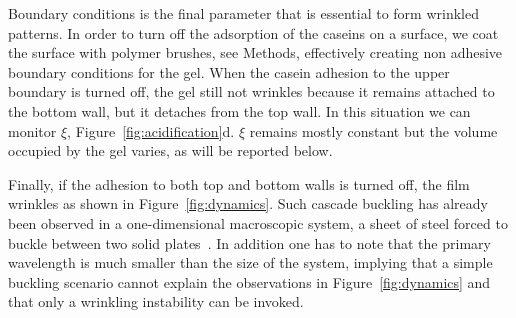 \documentclass[twocolumn,superscriptaddress,showpacs,preprintnumbers,
amsmath,amssymb,prl]{revtex4-1}
\begin{document}
Boundary conditions is the final parameter that is essential to form wrinkled patterns. In order to turn off the adsorption of the caseins on a surface, we coat the surface with polymer brushes, see Methods, effectively creating non adhesive boundary conditions for the gel. When the casein adhesion to the upper boundary is turned off, the gel still not wrinkles because it remains attached to the bottom wall, but it detaches from the top wall. In this situation we can monitor $\xi$, Figure~\ref{fig:acidification}d. $\xi$ remains mostly constant but the volume occupied by the gel varies, as will be reported below.

Finally, if the adhesion to both top and bottom walls is turned off, the film wrinkles as shown in Figure~\ref{fig:dynamics}. Such cascade buckling has already been observed in a one-dimensional macroscopic system, a sheet of steel forced to buckle between two solid plates~\cite{Roman1999}. In addition one has to note that the primary wavelength is much smaller than the size of the system, implying that a simple buckling scenario cannot explain the observations in Figure~\ref{fig:dynamics} and that only a wrinkling instability can be invoked.







\end{document}
